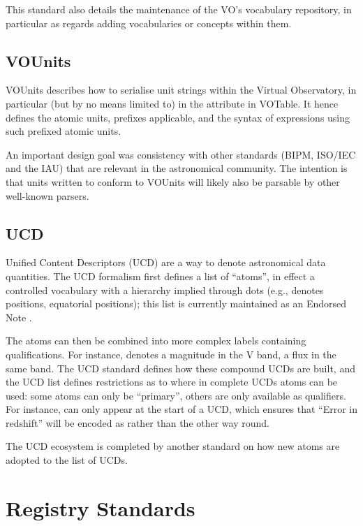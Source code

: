 \documentclass[11pt,letter]{ivoa}
\begin{document}
This standard also details the maintenance of the VO's vocabulary
repository, in particular as regards adding vocabularies or concepts
within them.

\subsection{VOUnits}

VOUnits \citep{2023ivoa.spec.1215G} describes how to serialise unit strings within the Virtual
Observatory, in particular (but by no means limited to) in the
 attribute in VOTable.  It hence defines the atomic units,
prefixes applicable, and the syntax of expressions using such prefixed
atomic units. 

An important design goal was consistency with other standards (BIPM,
ISO/IEC and the IAU) that are relevant in the astronomical community.
The intention is that units written to conform to VOUnits will likely
also be parsable by other well-known parsers.

\subsection{UCD}

Unified Content Descriptors (UCD) \citep{2019ivoa.spec.1007G} are a way to 
denote astronomical data
quantities.  The UCD formalism first defines a list of ``atoms'', in
effect a controlled vocabulary with a hierarchy implied through dots
(e.g.,  denotes positions,  equatorial positions);
this list is currently maintained as an Endorsed Note
\citep{2021ivoa.spec.0616C}.

The atoms can then be combined into more complex labels containing
qualifications.  For instance,  denotes a
magnitude in the V band,  a flux in the same
band.  The UCD standard defines how these compound UCDs are built, and
the UCD list defines restrictions as to where in complete UCDs atoms can
be used: some atoms can only be ``primary'', others are only available
as qualifiers.  For instance,  can only appear at the
start of a UCD, which ensures that ``Error in redshift'' will be encoded
as  rather than the other way round.

The UCD ecosystem is completed by another standard on how new atoms are
adopted to the list of UCDs.

\section{Registry Standards}
\end{document}

